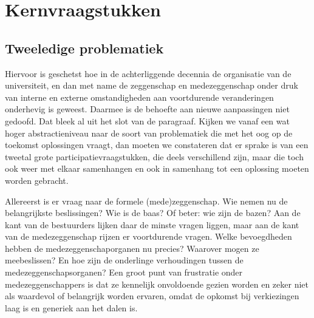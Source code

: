 \documentclass{jote-book}
\begin{document}
	\section{Kernvraagstukken}



	\subsection{Tweeledige problematiek}



	Hiervoor is geschetst hoe in de achterliggende decennia de organisatie van de universiteit, en dan met name de zeggenschap en medezeggenschap onder druk van interne en externe omstandigheden aan voortdurende veranderingen onderhevig is geweest. Daarmee is de behoefte aan nieuwe aanpassingen niet gedoofd. Dat bleek al uit het slot van de paragraaf. Kijken we vanaf een wat hoger abstractieniveau naar de soort van problematiek die met het oog op de toekomst oplossingen vraagt, dan moeten we constateren dat er sprake is van een tweetal grote participatievraagstukken, die deels verschillend zijn, maar die toch ook weer met elkaar samenhangen en ook in samenhang tot een oplossing moeten worden gebracht.



	Allereerst is er vraag naar de formele (mede)zeggenschap. Wie nemen nu de belangrijkste beslissingen? Wie is de baas? Of beter: wie zijn de bazen? Aan de kant van de bestuurders lijken daar de minste vragen liggen, maar aan de kant van de medezeggenschap rijzen er voortdurende vragen. Welke bevoegdheden hebben de medezeggenschaporganen nu precies? Waarover mogen ze meebeslissen? En hoe zijn de onderlinge verhoudingen tussen de medezeggenschapsorganen? Een groot punt van frustratie onder medezeggenschappers is dat ze kennelijk onvoldoende gezien worden en zeker niet als waardevol of belangrijk worden ervaren, omdat de opkomst bij verkiezingen laag is en generiek aan het dalen is.
\end{document}

